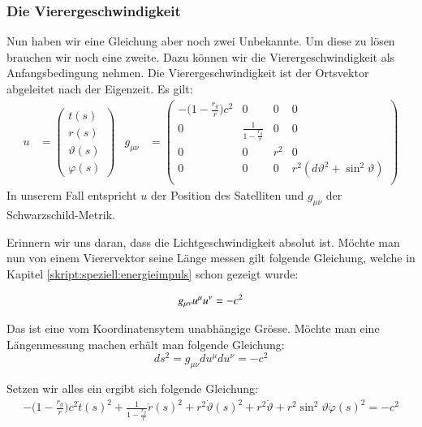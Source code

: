 \begin{refsection}
\subsubsection{Die Vierergeschwindigkeit}
Nun haben wir eine Gleichung aber noch zwei Unbekannte. Um diese zu lösen brauchen wir noch eine zweite. Dazu können wir die Vierergeschwindigkeit als Anfangsbedingung nehmen. Die Vierergeschwindigkeit ist der Ortsvektor abgeleitet nach der Eigenzeit. Es gilt:
\begin{align*}
u &= 
\begin{pmatrix}
t(s) \\
r(s) \\
\vartheta (s) \\
\varphi (s)
\end{pmatrix} &
g_{\mu\nu} &= 
\begin{pmatrix}
-\biggl(1-\frac{r_g}r\biggr)c^2 & 0 & 0 & 0 \\
0 & \frac1{\displaystyle 1-\frac{r_g}r} & 0 & 0 \\
0 & 0 &  r^2 & 0 \\
0 & 0 & 0 &  r^2(d\vartheta^2 + \sin^2\vartheta) \\
\end{pmatrix}
\end{align*}
In unserem Fall entspricht \( u \) der Position des Satelliten und \( g_{\mu\nu} \) der Schwarzschild-Metrik. 

Erinnern wir uns daran, dass die Lichtgeschwindigkeit absolut ist. Möchte man nun von einem Vierervektor seine Länge messen gilt folgende Gleichung, welche in Kapitel \ref{skript:speziell:energieimpuls} schon gezeigt wurde:

\begin{equation}
g_{\mu\nu}u^\mu u^\nu=-c^2 \\
\end{equation}

\noindent{}Das ist eine vom Koordinatensytem unabhängige Grösse. Möchte man eine Längenmessung machen erhält man folgende Gleichung: \\

\begin{equation}
ds^2 = g_{\mu\nu}du^\mu du^\nu = -c^2
\end{equation}

\noindent{}Setzen wir alles ein ergibt sich folgende Gleichung:
\begin{align*}
-\biggl(1-\frac{r_g}r\biggr)c^2 \dot t(s)^2 +  \frac1{\displaystyle 1-\frac{r_g}r} \dot r(s)^2 + r^2 \dot \vartheta(s)^2 + r^2 \dot \vartheta + r^2 \sin^2 \vartheta \dot \varphi (s)^2 = -c^2
\end{align*}


\end{refsection}

